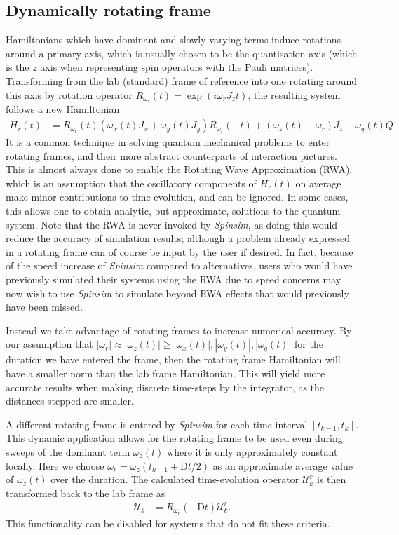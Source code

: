 \documentclass{jors}
\begin{document}
	\subsection{Dynamically rotating frame}
		Hamiltonians which have dominant and slowly-varying terms induce rotations around a primary axis, which is usually chosen to be the quantisation axis (which is the $ z $ axis when representing spin operators with the Pauli matrices).
		Transforming from the lab (standard) frame of reference into one rotating around this axis by rotation operator $ R_{\omega_r}(t) = \exp(i\omega_r J_z t) $, the resulting system follows a new Hamiltonian
		\begin{align}
			H_r(t) &= R_{\omega_r}(t) (\omega_x(t) J_x + \omega_y(t) J_y) R_{\omega_r}(-t) + (\omega_z(t) - \omega_r)J_z +\omega_q(t) Q
		\end{align}
		It is a common technique in solving quantum mechanical problems to enter rotating frames, and their more abstract counterparts of interaction pictures\cite[(p336,338)]{j_j_sakurai_jun_john_modern_2011}.
		This is almost always done to enable the Rotating Wave Approximation (RWA), which is an assumption that the oscillatory components of $ H_r(t) $ on average make minor contributions to time evolution, and can be ignored.
		In some cases, this allows one to obtain analytic, but approximate, solutions to the quantum system.
		Note that the RWA is never invoked by \emph{Spinsim}, as doing this would reduce the accuracy of simulation results; although a problem already expressed in a rotating frame can of course be input by the user if desired.
		In fact, because of the speed increase of \emph{Spinsim} compared to alternatives, users who would have previously simulated their systems using the RWA due to speed concerns may now wish to use \emph{Spinsim} to simulate beyond RWA effects that would previously have been missed.

		Instead we take advantage of rotating frames to increase numerical accuracy.
		By our assumption that $ |\omega_r| \approx |\omega_z(t)| \ge |\omega_x(t)|, |\omega_y(t)|, |\omega_q(t)| $ for the duration we have entered the frame, then the rotating frame Hamiltonian will have a smaller norm than the lab frame Hamiltonian.
		This will yield more accurate results when making discrete time-steps by the integrator, as the distances stepped are smaller.

		A different rotating frame is entered by \emph{Spinsim} for each time interval $ [t_{k - 1}, t_k] $.
		This dynamic application allows for the rotating frame to be used even during sweeps of the dominant term $ \omega_z(t) $ where it is only approximately constant locally.
		Here we choose $ \omega_r = \omega_z(t_{k - 1} + \mathrm{D}t/2) $ as an approximate average value of $ \omega_z(t) $ over the duration.
		The calculated time-evolution operator $ \mathcal{U}_k^r $ is then transformed back to the lab frame as
		\begin{align}
			\mathcal{U}_k &= R_{\omega_r}(-\mathrm{D}t)\mathcal{U}_k^r.\label{eq:exit_rotating_frame}
		\end{align}
		This functionality can be disabled for systems that do not fit these criteria.
\end{document}
